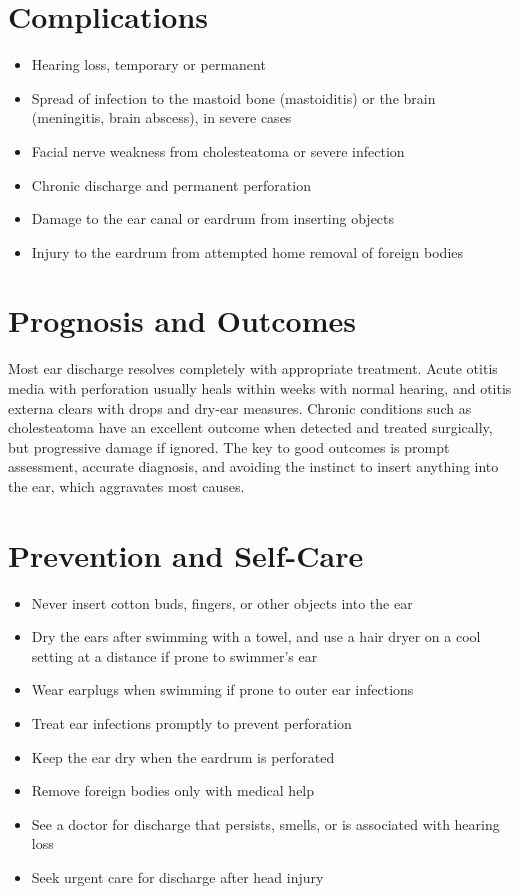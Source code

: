 \section*{Complications}
\begin{itemize}
    \item Hearing loss, temporary or permanent
    \item Spread of infection to the mastoid bone (mastoiditis) or the brain (meningitis, brain abscess), in severe cases
    \item Facial nerve weakness from cholesteatoma or severe infection
    \item Chronic discharge and permanent perforation
    \item Damage to the ear canal or eardrum from inserting objects
    \item Injury to the eardrum from attempted home removal of foreign bodies
\end{itemize}

\section*{Prognosis and Outcomes}
Most ear discharge resolves completely with appropriate treatment. Acute otitis media with perforation usually heals within weeks with normal hearing, and otitis externa clears with drops and dry-ear measures. Chronic conditions such as cholesteatoma have an excellent outcome when detected and treated surgically, but progressive damage if ignored. The key to good outcomes is prompt assessment, accurate diagnosis, and avoiding the instinct to insert anything into the ear, which aggravates most causes.

\section*{Prevention and Self-Care}
\begin{itemize}
    \item Never insert cotton buds, fingers, or other objects into the ear
    \item Dry the ears after swimming with a towel, and use a hair dryer on a cool setting at a distance if prone to swimmer's ear
    \item Wear earplugs when swimming if prone to outer ear infections
    \item Treat ear infections promptly to prevent perforation
    \item Keep the ear dry when the eardrum is perforated
    \item Remove foreign bodies only with medical help
    \item See a doctor for discharge that persists, smells, or is associated with hearing loss
    \item Seek urgent care for discharge after head injury
\end{itemize}

